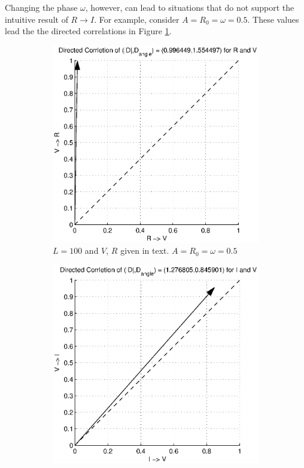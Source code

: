 \documentclass[a4paper,11pt]{article}
\begin{document}
Changing the phase $\omega$, however, can lead to situations that do not support the intuitive result of $R\rightarrow I$.  For example, consider $A=R_0=\omega=0.5$.  These values lead the the directed correlations in Figure \ref{fig:RL_Rsin1VsinCCMVR}.
\begin{figure}[h!t]
\centering
\begin{subfigure}[b]{0.25\textwidth}
\label{fig:RL_Rsin1VsinCCMVR}
\includegraphics[scale=0.4]{graphics/RL_Rsin1VsinCCMVR.eps}
\caption{$L = 100$ and $V$, $R$ given in text. $A=R_0=\omega=0.5$}
\end{subfigure}
\begin{subfigure}[b]{0.25\textwidth}
\label{fig:RL_Rsin1VsinCCMVI}
\includegraphics[scale=0.4]{graphics/RL_Rsin1VsinCCMVI.eps}

\end{subfigure}
\end{figure}
\end{document}
